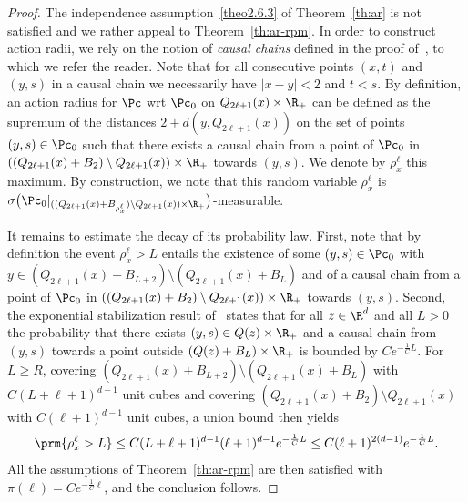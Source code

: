 \begin{proof}
The independence assumption~\eqref{theo2.6.3} of Theorem~\ref{th:ar} is not satisfied and we rather appeal to Theorem~\ref{th:ar-rpm}. In order to construct action radii, we rely on the notion of \emph{causal chains} defined in the proof of~\cite[Lemma~3.5]{Schreiber-Penrose-Yukich-07}, to which we refer the reader. Note that for all consecutive points $(x,t)$ and $(y,s)$ in a causal chain we necessarily have $|x-y|<2$ and $t<s$. By definition, an action radius for $\Pc$ wrt $\Pc_0$ on $Q_{2\ell+1}(x)\times\R_+$ can be defined as the supremum of the distances $2+d(y,Q_{2\ell+1}(x))$ on the set of points $(y,s)\in\Pc_0$ such that there exists a causal chain from a point of $\Pc_0$ in $((Q_{2\ell+1}(x)+B_{2})\setminus Q_{2\ell+1}(x))\times\R_+$ towards $(y,s)$. We denote by $\rho_x^\ell$ this maximum. By construction, we note that this random variable $\rho_x^\ell$ is $\sigma\big(\Pc_0|_{((Q_{2\ell+1}(x)+B_{\rho_x^\ell})\setminus Q_{2\ell+1}(x))\times\R_+}\big)$-measurable.

It remains to estimate the decay of its probability law. First, note that by definition the event $\rho_x^\ell>L$ entails the existence of some $(y,s)\in \Pc_0$ with $y\in(Q_{2\ell+1}(x)+B_{L+2})\setminus(Q_{2\ell+1}(x)+B_{L})$ and of a causal chain from a point of $\Pc_0$ in $((Q_{2\ell+1}(x)+B_{2})\setminus Q_{2\ell+1}(x))\times\R_+$ towards $(y,s)$. Second, the exponential stabilization result of~\cite[Lemma~3.5]{Schreiber-Penrose-Yukich-07} states that for all $z\in\R^d$ and all $L>0$ the probability that there exists $(y,s)\in Q(z)\times\R_+$ and a causal chain from $(y,s)$ towards a point outside $(Q(z)+B_{L})\times\R_+$ is bounded by $Ce^{-\frac1{C}L}$. For $L\ge R$, covering $(Q_{2\ell+1}(x)+B_{L+2})\setminus(Q_{2\ell+1}(x)+B_{L})$ with $C(L+\ell+1)^{d-1}$ unit cubes and covering $(Q_{2\ell+1}(x)+B_{2})\setminus Q_{2\ell+1}(x)$ with $C(\ell+1)^{d-1}$ unit cubes, a union bound then yields
\begin{equation}\label{eq:bound-rhoxl-rpm}
\prm{\rho_x^\ell>L}\le C(L+\ell+1)^{d-1}(\ell+1)^{d-1}e^{-\frac1{C}L}\le C(\ell+1)^{2(d-1)}e^{-\frac1{C}L}.
\end{equation}
All the assumptions of Theorem~\ref{th:ar-rpm} are then satisfied with $\pi(\ell)=Ce^{-\frac1{C}\ell}$, and the conclusion follows.
\end{proof}


